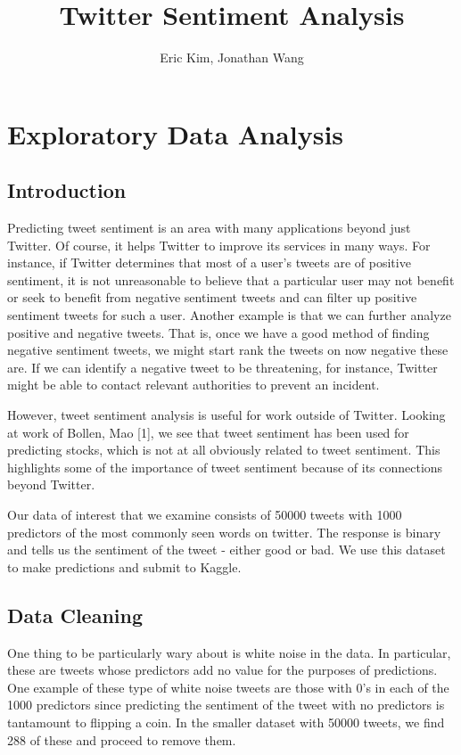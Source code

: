 \documentclass{article}
\title{Twitter Sentiment Analysis}
\author{Eric Kim, Jonathan Wang}
\date{}
\begin{document}
\maketitle

\section{Exploratory Data Analysis}

\subsection{Introduction}
Predicting tweet sentiment is an area with many applications beyond just Twitter. Of course, it helps Twitter to improve its services in many ways. For instance, if Twitter determines that most of a user's tweets are of positive sentiment, it is not unreasonable to believe that a particular user may not benefit or seek to benefit from negative sentiment tweets and can filter up positive sentiment tweets for such a user. Another example is that we can further analyze positive and negative tweets. That is, once we have a good method of finding negative sentiment tweets, we might start rank the tweets on now negative these are. If we can identify a negative tweet to be threatening, for instance, Twitter might be able to contact relevant authorities to prevent an incident.

However, tweet sentiment analysis is useful for work outside of Twitter. Looking at work of Bollen, Mao [1], we see that tweet sentiment has been used for predicting stocks, which is not at all obviously related to tweet sentiment. This highlights some of the importance of tweet sentiment because of its connections beyond Twitter.

Our data of interest that we examine consists of 50000 tweets with 1000 predictors of the most commonly seen words on twitter. The response is binary and tells us the sentiment of the tweet - either good or bad. We use this dataset to make predictions and submit to Kaggle. %

\subsection{Data Cleaning}
One thing to be particularly wary about is white noise in the data. In particular, these are tweets whose predictors add no value for the purposes of predictions. One example of these type of white noise tweets are those with $0$'s in each of the 1000 predictors since predicting the sentiment of the tweet with no predictors is tantamount to flipping a coin. In the smaller dataset with 50000 tweets, we find 288 of these and proceed to remove them.
\end{document}
